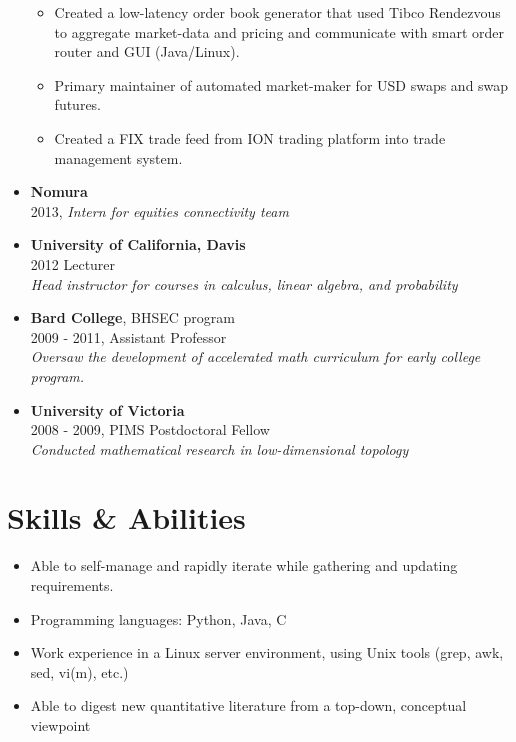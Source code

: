 \documentclass[margin]{res}
\def\tightlist{}
\begin{document}
\begin{resume}
\begin{itemize}
  \begin{itemize}
  \tightlist
  \item
    Created a low-latency order book generator that used Tibco
    Rendezvous to aggregate market-data and pricing and communicate with
    smart order router and GUI (Java/Linux).
  \item
    Primary maintainer of automated market-maker for USD swaps and swap
    futures.
  \item
    Created a FIX trade feed from ION trading platform into trade
    management system.
  \end{itemize}
\item
  \textbf{Nomura}\\
  2013, \emph{Intern for equities connectivity team}
\item
  \textbf{University of California, Davis}\\
  2012 Lecturer\\
  \emph{Head instructor for courses in calculus, linear algebra, and
  probability}
\item
  \textbf{Bard College}, BHSEC program\\
  2009 - 2011, Assistant Professor\\
  \emph{Oversaw the development of accelerated math curriculum for early
  college program.}
\item
  \textbf{University of Victoria}\\
  2008 - 2009, PIMS Postdoctoral Fellow\\
  \emph{Conducted mathematical research in low-dimensional topology}
\end{itemize}

\section{Skills \& Abilities}\label{skills-abilities}

\begin{itemize}
\tightlist
\item
  Able to self-manage and rapidly iterate while gathering and updating
  requirements.
\item
  Programming languages: {Python}, {Java}, {C}
\item
  Work experience in a Linux server environment, using Unix tools (grep,
  awk, sed, vi(m), etc.)
\item
  Able to digest new quantitative literature from a top-down, conceptual
  viewpoint
\end{itemize}


\end{resume}
\end{document}
